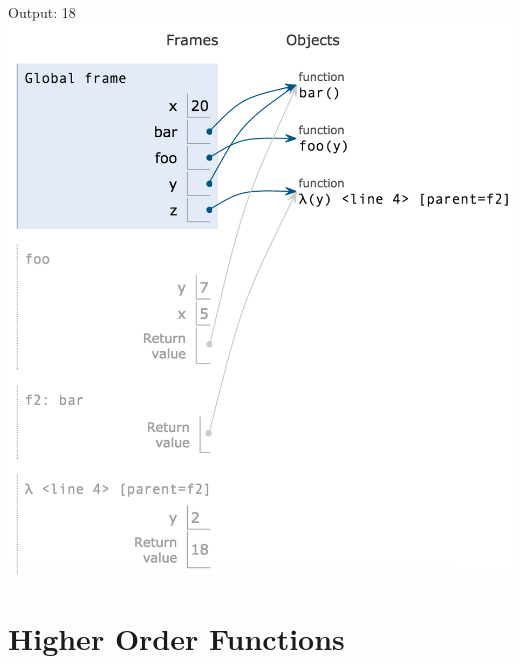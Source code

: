 \documentclass{exam}
\begin{document}
\begin{questions}
\begin{blocksection}
\begin{solution}[0.3in] \newline
   Output: 18 \newline
    \includegraphics[scale=0.5]{img/foobar2.png}
\end{solution}
\end{blocksection}
\end{questions}

\section{Higher Order Functions}
\end{document}
